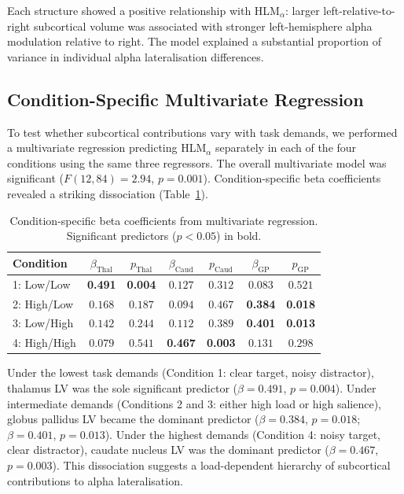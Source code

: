 \documentclass[11pt]{article}
\begin{document}
Each structure showed a positive relationship with HLM$_\alpha$: larger left-relative-to-right subcortical volume was associated with stronger left-hemisphere alpha modulation relative to right. The model explained a substantial proportion of variance in individual alpha lateralisation differences.

\subsection{Condition-Specific Multivariate Regression}

To test whether subcortical contributions vary with task demands, we performed a multivariate regression predicting HLM$_\alpha$ separately in each of the four conditions using the same three regressors. The overall multivariate model was significant ($F(12, 84) = 2.94$, $p = 0.001$). Condition-specific beta coefficients revealed a striking dissociation (Table~\ref{tab:condition_betas}).

\begin{table}[H]
\centering
\caption{Condition-specific beta coefficients from multivariate regression. Significant predictors ($p < 0.05$) in bold.}
\label{tab:condition_betas}
\begin{tabular}{@{}lcccccc@{}}
\toprule
Condition & $\beta_{\text{Thal}}$ & $p_{\text{Thal}}$ & $\beta_{\text{Caud}}$ & $p_{\text{Caud}}$ & $\beta_{\text{GP}}$ & $p_{\text{GP}}$ \\
\midrule
1: Low/Low & \textbf{0.491} & \textbf{0.004} & $0.127$ & $0.312$ & $0.083$ & $0.521$ \\
2: High/Low & $0.168$ & $0.187$ & $0.094$ & $0.467$ & \textbf{0.384} & \textbf{0.018} \\
3: Low/High & $0.142$ & $0.244$ & $0.112$ & $0.389$ & \textbf{0.401} & \textbf{0.013} \\
4: High/High & $0.079$ & $0.541$ & \textbf{0.467} & \textbf{0.003} & $0.131$ & $0.298$ \\
\bottomrule
\end{tabular}
\end{table}

Under the lowest task demands (Condition 1: clear target, noisy distractor), thalamus LV was the sole significant predictor ($\beta = 0.491$, $p = 0.004$). Under intermediate demands (Conditions 2 and 3: either high load or high salience), globus pallidus LV became the dominant predictor ($\beta = 0.384$, $p = 0.018$; $\beta = 0.401$, $p = 0.013$). Under the highest demands (Condition 4: noisy target, clear distractor), caudate nucleus LV was the dominant predictor ($\beta = 0.467$, $p = 0.003$). This dissociation suggests a load-dependent hierarchy of subcortical contributions to alpha lateralisation.
\end{document}
